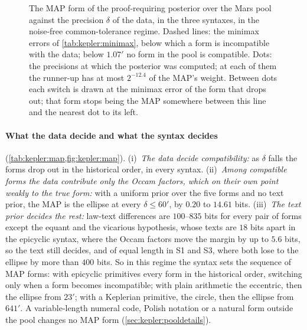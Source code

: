 \begin{figure}[t]
\caption{The MAP form of the proof-requiring posterior over the Mars pool against the precision $\delta$ of the data, in the three syntaxes, in the noise-free common-tolerance regime. Dashed lines: the minimax errors of \cref{tab:kepler:minimax}, below which a form is incompatible with the data; below $1.07'$ no form in the pool is compatible. Dots: the precisions at which the posterior was computed; at each of them the runner-up has at most $2^{-12.4}$ of the MAP's weight. Between dots each switch is drawn at the minimax error of the form that drops out; that form stops being the MAP somewhere between this line and the nearest dot to its left.}\label{fig:kepler:map}
\end{figure}

\paragraph{What the data decide and what the syntax decides} (\cref{tab:kepler:map,fig:kepler:map}). (i)~\emph{The data decide compatibility:} as $\delta$ falls the forms drop out in the historical order, in every syntax. (ii)~\emph{Among compatible forms the data contribute only the Occam factors, which on their own point weakly to the true form:} with a uniform prior over the five forms and no text prior, the MAP is the ellipse at every $\delta\le60'$, by $0.20$ to $14.61$ bits. (iii)~\emph{The text prior decides the rest:} law-text differences are $100$--$835$ bits for every pair of forms except the equant and the vicarious hypothesis, whose texts are $18$ bits apart in the epicyclic syntax, where the Occam factors move the margin by up to $5.6$ bits, so the text still decides, and of equal length in S1 and S3, where both lose to the ellipse by more than $400$ bits. So in this regime the syntax sets the sequence of MAP forms: with epicyclic primitives every form in the historical order, switching only when a form becomes incompatible; with plain arithmetic the eccentric, then the ellipse from $23'$; with a Keplerian primitive, the circle, then the ellipse from $641'$. A variable-length numeral code, Polish notation or a natural form outside the pool changes no MAP form (\cref{sec:kepler:pooldetails}).

